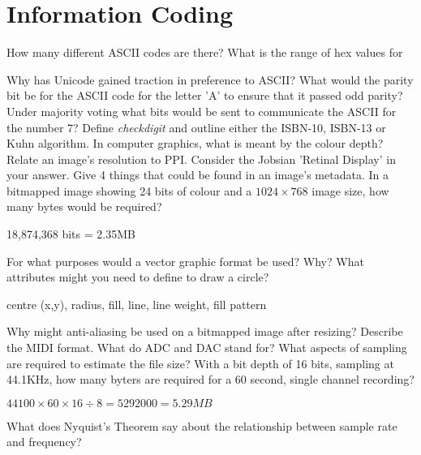 \section{Information Coding}

\begin{questions}
	\question How many different ASCII codes are there? 
	\question What is the range of hex values for 
	\question Why has Unicode gained traction in preference to ASCII? 
	\question What would the parity bit be for the ASCII code for the letter 'A' to ensure that it passed odd parity? 
	\question Under majority voting what bits would be sent to communicate the ASCII for the number 7? 
	\question Define \emph{checkdigit} and outline either the ISBN-10, ISBN-13 or Kuhn algorithm. 
	\question In computer graphics, what is meant by the colour depth? 
	\question Relate an image's resolution to PPI. Consider the Jobsian 'Retinal Display' in your answer.
	\question Give 4 things that could be found in an image's metadata.  
	\question In a bitmapped image showing 24 bits of colour and a $1024 \times 768$ image size, how many bytes would be required? 
	\begin{solution}
	18,874,368 bits = 2.35MB
	\end{solution}
	\question For what purposes would a vector graphic format be used? Why?
	\question What attributes might you need to define to draw a circle? \begin{solution}centre (x,y), radius, fill, line, line weight, fill pattern\end{solution}
	\question Why might anti-aliasing be used on a bitmapped image after resizing?   
	\question Describe the MIDI format. 
	\question What do ADC and DAC stand for? 
	\question What aspects of sampling are required to estimate the file size? 
	\question With a bit depth of 16 bits, sampling at 44.1KHz, how many byters are required for a 60 second, single channel recording? \begin{solution}$44100 \times 60 \times 16 \div 8 = 5292000 = 5.29MB$\end{solution}    
	\question What does Nyquist's Theorem say about the relationship between sample rate and frequency? 
\end{questions}